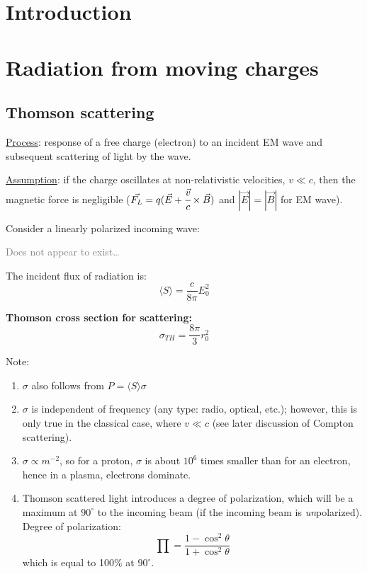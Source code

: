 \documentclass[12pt]{article}
\newcommand{\mar}[1]{\hspace{0pt}\marginpar{-\textcolor{black}{#1}-}}
\newcommand{\mynotes}[1]{\textcolor{mygreen}{#1}}
\begin{document}
\setlength{\parskip}{0pt}
\tableofcontents
\setlength{\parskip}{10pt}
\hypersetup{colorlinks=true, urlcolor=darkpowderblue, linkcolor=darkpowderblue,}
\reversemarginpar

\newpage
\section{Introduction}

\newpage
\section{Radiation from moving charges}
\mar{37}

\subsection{Thomson scattering}
\mar{52}\underline{Process}: response of a free charge (electron) to an
incident EM wave and subsequent scattering of light by the wave.

\underline{Assumption}: if the charge oscillates at non-relativistic velocities,
$v \ll c$, then the magnetic force is negligible
($ \vec{F_{L}} = q (\vec{E} + \cfrac{\vec{v}}{c} \times \vec{B} )  $
and $ |\vec{E}| = |\vec{B}|$ for EM wave).

Consider a linearly polarized incoming wave:

\mar{53}\textcolor{gray}{Does not appear to exist\ldots}

\mar{54}The incident flux of radiation is:
\[
    \langle S \rangle
    = \frac{c}{8\pi} E_{0}^{2}
    \]

\begin{framed}
    \textbf{Thomson cross section for scattering:}
    \[
    \sigma_{TH} = \frac{8\pi}{3} r_{0}^{2}
        \]
\end{framed}

Note:
\begin{enumerate}
    \item $\sigma$ also follows from $P = \langle S \rangle \sigma$
    \item $\sigma$ is independent of frequency \mynotes{(any type:
        radio, optical, etc.)}; however, this is only true in the classical
        case, where $v \ll c$ (see later discussion of Compton scattering).
    \item $\sigma \propto m^{-2} $, so for a proton, $\sigma$ is about $10^{6}$
        times smaller than for an electron, hence in a plasma, electrons
        dominate.
    \item Thomson scattered light introduces a degree of polarization,
        which will be a maximum at $90^{\circ}$ to the incoming beam
        (if the incoming beam is \emph{un}polarized).
        Degree of polarization:
        \[
            \prod = \frac{1-\cos^{2}\theta}{1+\cos^{2}\theta}
            \]
        which is equal to 100\% at $90^{\circ}$.
\end{enumerate}
\end{document}
